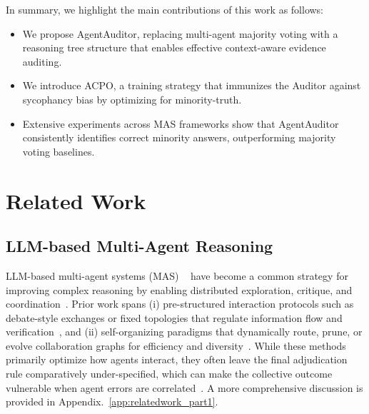 \documentclass{article}
\theoremstyle{plain}
\theoremstyle{definition}
\theoremstyle{remark}
\begin{document}
In summary, we highlight the main contributions of this work as follows:
\begin{itemize}[noitemsep,nosep]
    \item We propose AgentAuditor, replacing multi-agent majority voting with a reasoning tree structure that enables effective context-aware evidence auditing.
    \item We introduce ACPO, a training strategy that immunizes the Auditor against sycophancy bias by optimizing for minority-truth.
    \item Extensive experiments across MAS frameworks show that AgentAuditor consistently identifies correct minority answers, outperforming majority voting baselines.
\end{itemize}



\section{Related Work}
\subsection{LLM-based Multi-Agent Reasoning}
LLM-based multi-agent systems (MAS) ~\cite{yang2025toward,qiao2024autoact,yang2025learning} have become a common strategy for improving complex reasoning by enabling distributed exploration, critique, and coordination~\cite{hong2023metagpt,chen2023agentverse,wu2024autogen,zhang2024aflow,ning2023skeleton}. 
Prior work spans (i) pre-structured interaction protocols such as debate-style exchanges or fixed topologies that regulate information flow and verification~\cite{du2023improving,liu2024groupdebate}, and (ii) self-organizing paradigms that dynamically route, prune, or evolve collaboration graphs for efficiency and diversity~\cite{hu2024automated,zhuge2024gptswarm,zhang2024aflow}. 
While these methods primarily optimize how agents interact, they often leave the final adjudication rule comparatively under-specified, which can make the collective outcome vulnerable when agent errors are correlated~\citep{wei2025lero,jiang2025qllm,alsadat2024multi,lin2025speaking}.
A more comprehensive discussion is provided in Appendix.~\ref{app:relatedwork_part1}.

\end{document}
